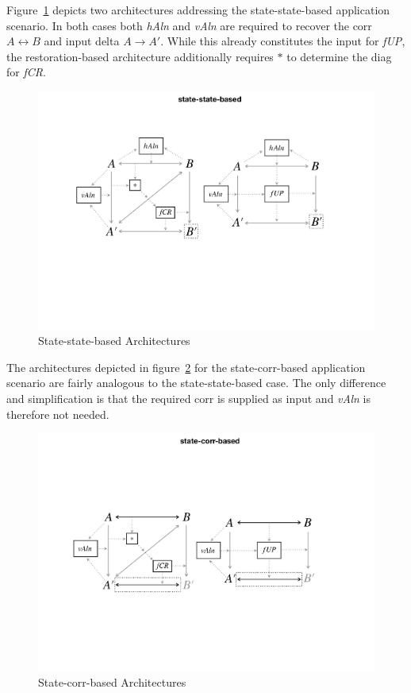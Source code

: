 Figure~\ref{fig:stateStateBased} depicts two architectures addressing the state-state-based application scenario.
In both cases both \emph{hAln} and \emph{vAln} are required to recover the corr $A \leftrightarrow B$ and input delta $A \rightarrow A'$.
While this already constitutes the input for \emph{fUP}, the restoration-based architecture additionally requires $\ast$ to determine the diag for \emph{fCR}.
%
\begin{figure}[tb!]
	\centering
	\includegraphics[width=\columnwidth]{diagrams/foundations/state-state-based}
	\caption{State-state-based Architectures}
	\label{fig:stateStateBased}
\end{figure}

The architectures depicted in figure~\ref{fig:stateCorrBased} for the state-corr-based application scenario are fairly analogous to the state-state-based case.
The only difference and simplification is that the required corr is supplied as input and \emph{vAln} is therefore not needed.
\begin{figure}[tb!]
	\centering
	\includegraphics[width=\columnwidth]{diagrams/foundations/state-corr-based}
	\caption{State-corr-based Architectures}
	\label{fig:stateCorrBased}
\end{figure}

